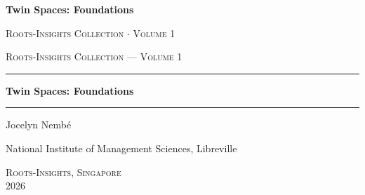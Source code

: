 \documentclass[11pt,a4paper,openany]{book}
\theoremstyle{plain}
\theoremstyle{definition}
\begin{document}

\frontmatter

\begin{titlepage}
\thispagestyle{empty}
\vspace*{\fill}
\begin{center}
{\LARGE\bfseries Twin Spaces: Foundations}
\end{center}
\vspace*{\fill}
\end{titlepage}

\cleardoublepage

\thispagestyle{empty}
\vspace*{\fill}
\begin{center}
\textsc{Roots-Insights Collection $\cdot$ Volume 1}
\end{center}
\vspace*{\fill}

\cleardoublepage

\begin{titlepage}
\thispagestyle{empty}
\vspace*{2cm}
\begin{center}

{\small\textsc{Roots-Insights Collection --- Volume 1}}

\vspace{1cm}
\rule{0.4\textwidth}{0.5pt}

\vspace{1.5cm}
{\Huge\bfseries\color{chaptercolor} Twin Spaces: Foundations}

\vspace{0.8cm}
\rule{0.4\textwidth}{0.5pt}

\vspace{2cm}
{\Large Jocelyn Nemb\'e}

\vspace{0.5cm}
{\normalsize National Institute of Management Sciences, Libreville}

\vspace{3cm}
{\small\textsc{Roots-Insights, Singapore}}\\[0.5em]
{\small 2026}

\end{center}
\end{titlepage}

\cleardoublepage
\end{document}
